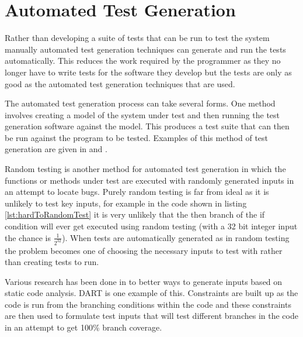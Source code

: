 \documentclass[authoryearcitations]{UoYCSproject}
\begin{document}


\section{Automated Test Generation}
Rather than developing a suite of tests that can be run to test the system manually automated test generation techniques can generate and run the tests automatically. This reduces the work required by the programmer as they no longer have to write tests for the software they develop but the tests are only as good as the automated test generation techniques that are used.

The automated test generation process can take several forms. One method involves creating a model of the system under test and then running the test generation software against the model. This produces a test suite that can then be run against the program to be tested. Examples of this method of test generation are given in \cite{Tahat01} and \cite{Clarke98}.

Random testing is another method for automated test generation in which the functions or methods under test are executed with randomly generated inputs in an attempt to locate bugs. Purely random testing is far from ideal as it is unlikely to test key inputs, for example in the code shown in listing \ref{lst:hardToRandomTest} it is very unlikely that the then branch of the if condition will ever get executed using random testing (with a 32 bit integer input the chance is $\frac{1}{2^{32}}$). When tests are automatically generated as in random testing the problem becomes one of choosing the necessary inputs to test with rather than creating tests to run.

Various research has been done in to better ways to generate inputs based on static code analysis. DART is one example of this. Constraints are built up as the code is run from the branching conditions within the code and these constraints are then used to formulate test inputs that will test different branches in the code in an attempt to get 100\% branch coverage.
\end{document}
